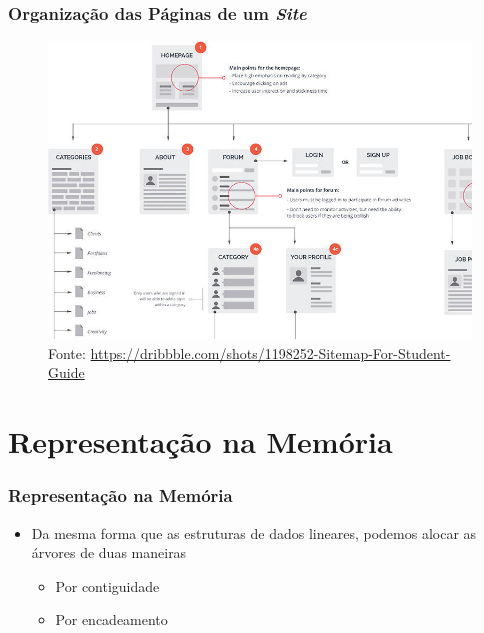 \documentclass[aspectratio=169]{beamer}
\begin{document}
\begin{frame}\frametitle{Organização das Páginas de um \emph{Site}}
\vspace{-3mm}
\begin{figure}[h]
	\centering
	\includegraphics[height=0.70\paperheight]{imagens/paginas_web.jpg}\\
{\tiny Fonte: \url{https://dribbble.com/shots/1198252-Sitemap-For-Student-Guide}}
\end{figure}	
\end{frame}

	
\section{Representação na Memória}

\begin{frame}\frametitle{Representação na Memória}
\begin{itemize}
	\item Da mesma forma que as estruturas de dados lineares, podemos alocar as árvores de duas maneiras
	\begin{itemize}
		\item Por contiguidade
		\item Por encadeamento
	\end{itemize}
\end{itemize}
\end{frame}
\end{document}
